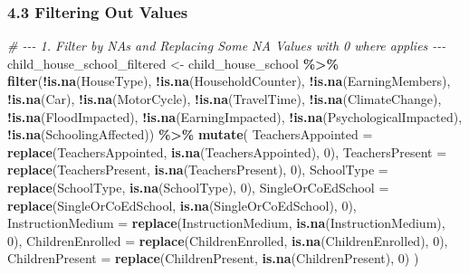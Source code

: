 \documentclass[
]{article}
\newenvironment{Shaded}{\begin{snugshade}}{\end{snugshade}}
\newcommand{\AttributeTok}[1]{\textcolor[rgb]{0.13,0.29,0.53}{#1}}
\newcommand{\CommentTok}[1]{\textcolor[rgb]{0.56,0.35,0.01}{\textit{#1}}}
\newcommand{\DecValTok}[1]{\textcolor[rgb]{0.00,0.00,0.81}{#1}}
\newcommand{\FunctionTok}[1]{\textcolor[rgb]{0.13,0.29,0.53}{\textbf{#1}}}
\newcommand{\NormalTok}[1]{#1}
\newcommand{\OtherTok}[1]{\textcolor[rgb]{0.56,0.35,0.01}{#1}}
\newcommand{\SpecialCharTok}[1]{\textcolor[rgb]{0.81,0.36,0.00}{\textbf{#1}}}
\begin{document}
\subsubsection{4.3 Filtering Out Values}\label{filtering-out-values}

\begin{Shaded}
\begin{Highlighting}[]
\CommentTok{\# {-}{-}{-} 1. Filter by NAs and Replacing Some NA Values with 0 where applies {-}{-}{-}}
\NormalTok{child\_house\_school\_filtered }\OtherTok{\textless{}{-}}\NormalTok{ child\_house\_school }\SpecialCharTok{\%\textgreater{}\%}
  \FunctionTok{filter}\NormalTok{(}\SpecialCharTok{!}\FunctionTok{is.na}\NormalTok{(HouseType), }\SpecialCharTok{!}\FunctionTok{is.na}\NormalTok{(HouseholdCounter), }\SpecialCharTok{!}\FunctionTok{is.na}\NormalTok{(EarningMembers), }\SpecialCharTok{!}\FunctionTok{is.na}\NormalTok{(Car), }\SpecialCharTok{!}\FunctionTok{is.na}\NormalTok{(MotorCycle), }\SpecialCharTok{!}\FunctionTok{is.na}\NormalTok{(TravelTime), }\SpecialCharTok{!}\FunctionTok{is.na}\NormalTok{(ClimateChange), }\SpecialCharTok{!}\FunctionTok{is.na}\NormalTok{(FloodImpacted), }\SpecialCharTok{!}\FunctionTok{is.na}\NormalTok{(EarningImpacted), }\SpecialCharTok{!}\FunctionTok{is.na}\NormalTok{(PsychologicalImpacted), }\SpecialCharTok{!}\FunctionTok{is.na}\NormalTok{(SchoolingAffected)) }\SpecialCharTok{\%\textgreater{}\%}
  \FunctionTok{mutate}\NormalTok{(}
  \AttributeTok{TeachersAppointed =} \FunctionTok{replace}\NormalTok{(TeachersAppointed, }\FunctionTok{is.na}\NormalTok{(TeachersAppointed), }\DecValTok{0}\NormalTok{),}
  \AttributeTok{TeachersPresent =} \FunctionTok{replace}\NormalTok{(TeachersPresent, }\FunctionTok{is.na}\NormalTok{(TeachersPresent), }\DecValTok{0}\NormalTok{),}
  \AttributeTok{SchoolType =} \FunctionTok{replace}\NormalTok{(SchoolType, }\FunctionTok{is.na}\NormalTok{(SchoolType), }\DecValTok{0}\NormalTok{),}
  \AttributeTok{SingleOrCoEdSchool =} \FunctionTok{replace}\NormalTok{(SingleOrCoEdSchool, }\FunctionTok{is.na}\NormalTok{(SingleOrCoEdSchool), }\DecValTok{0}\NormalTok{),}
  \AttributeTok{InstructionMedium =} \FunctionTok{replace}\NormalTok{(InstructionMedium, }\FunctionTok{is.na}\NormalTok{(InstructionMedium), }\DecValTok{0}\NormalTok{),}
  \AttributeTok{ChildrenEnrolled =} \FunctionTok{replace}\NormalTok{(ChildrenEnrolled, }\FunctionTok{is.na}\NormalTok{(ChildrenEnrolled), }\DecValTok{0}\NormalTok{),}
  \AttributeTok{ChildrenPresent =} \FunctionTok{replace}\NormalTok{(ChildrenPresent, }\FunctionTok{is.na}\NormalTok{(ChildrenPresent), }\DecValTok{0}\NormalTok{)}
\NormalTok{)}


\end{Highlighting}
\end{Shaded}
\end{document}
